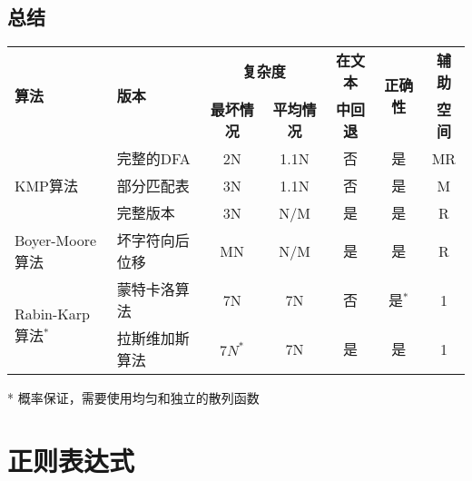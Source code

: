 \subsection{总结}
\vspace{1ex}
\begin{center}
\begin{tabular}{llccccc}
\hline
\multirow{2}{*}{\textbf{算法}} & \multirow{2}{*}{\textbf{版本}} & \multicolumn{2}{c}{\textbf{复杂度}} & \textbf{在文本} & \multirow{2}{*}{\textbf{正确性}} & \textbf{辅助}\\
\cline{3-4} & & \textbf{最坏情况} & \textbf{平均情况} & \textbf{中回退} & & \textbf{空间}\\
\hline
\multirow{3}{*}{KMP算法} & 完整的DFA & 2N & 1.1N & 否 & 是 & MR\\
                         & 部分匹配表 & 3N & 1.1N & 否 & 是 & M\\
						 & 完整版本 & 3N & N/M & 是 & 是 & R\\
\hline
Boyer-Moore算法 & 坏字符向后位移 & MN & N/M & 是 & 是 & R\\
\hline
\multirow{2}{*}{Rabin-Karp算法$^*$} & 蒙特卡洛算法 & 7N & 7N & 否 & 是$^*$ & 1\\
                         & 拉斯维加斯算法 & $7N^*$ & 7N & 是 & 是 & 1\\
\hline
\end{tabular}
\end{center}
\small{* 概率保证，需要使用均匀和独立的散列函数}


\section{正则表达式} %
